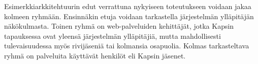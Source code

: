 Esimerkkiarkkitehtuurin edut verrattuna nykyiseen toteutukseen voidaan jakaa kolmeen ryhmään. Ensinnäkin etuja voidaan tarkastella järjestelmän ylläpitäjän näkökulmasta. Toinen ryhmä on web-palveluiden kehittäjät, jotka Kapsin tapauksessa ovat yleensä järjestelmän ylläpitäjiä, mutta mahdollisesti tulevaisuudessa myös rivijäseniä tai kolmansia osapuolia. Kolmas tarkasteltava ryhmä on palveluita käyttävät henkilöt eli Kapsin jäsenet.